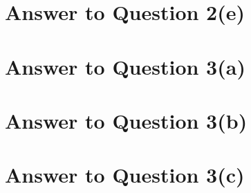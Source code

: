 \documentclass[11pt]{article}
\begin{document}
\pagebreak[4]
\section*{Answer to Question 2(e)}

\pagebreak[4]
\section*{Answer to Question 3(a)}

\pagebreak[4]
\section*{Answer to Question 3(b)}

\pagebreak[4]
\section*{Answer to Question 3(c)}

\pagebreak[4]
\end{document}
